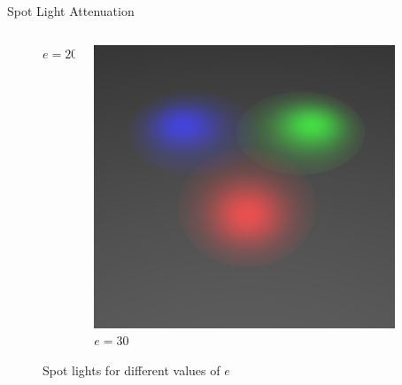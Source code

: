 \begin{frame}{Spot Light Attenuation}
{\begin{figure}
\begin{columns}
\begin{column}{0.25\textwidth}
          \centering
          {\footnotesize $e=20$}
        \end{column}
        \begin{column}{0.25\textwidth}
          \includegraphics[width=\linewidth]{images/spot_e_30.png}
          \centering
          {\footnotesize $e=30$}
        \end{column}
      \end{columns}
      \caption*{Spot lights for different values of $e$}
    \end{figure}
  }
\end{frame}
